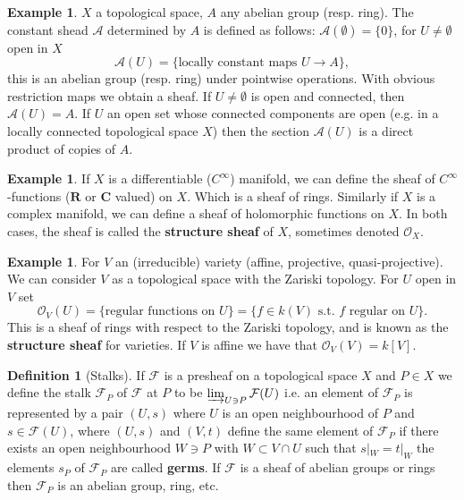 \documentclass[10pt,]{book}
\newcommand{\terminology}[1]{\textbf{#1}}
\theoremstyle{plain}
\theoremstyle{definition}
\newtheorem{definition}[theorem]{Definition}
\newtheorem{example}[theorem]{Example}
\newcommand{\CC}{\mathbf{C}}
\newcommand{\RR}{\mathbf{R}}
\newcommand{\A}{\mathcal{A}}
\newcommand{\F}{\mathcal{F}}
\newcommand{\cO}{\mathcal{O}}
\begin{document}
\begin{example}\label{example-1}
\(X\) a topological space, \(A\) any abelian group (resp. ring).
            The constant shead \(\A\) determined by \(A\) is defined as follows: \(\A(\emptyset) = \{0\}\), for \(U \ne \emptyset\) open in \(X\)\[\A(U) = \{\text{locally constant maps }U\to A\},\] this is an abelian group (resp. ring) under pointwise operations.
            With obvious restriction maps we obtain a sheaf.
            If \(U \ne \emptyset\) is open and connected, then \(\A(U) = A\).
            If \(U\) an open set whose connected components are open (e.g. in a locally connected topological space \(X\)) then the section \(\A(U)\) is a direct product of copies of \(A\).
          \end{example}
\begin{example}\label{example-2}
If \(X\) is a differentiable (\(C^\infty\)) manifold, we can define the sheaf of \(C^\infty\)-functions (\(\RR\) or \(\CC\) valued) on \(X\).
            Which is a sheaf of rings.
            Similarly if \(X\) is a complex manifold, we can define a sheaf of holomorphic functions on \(X\).
            In both cases, the sheaf is called the \terminology{structure sheaf} of \(X\), sometimes denoted \(\cO_X\).
          \end{example}
\begin{example}\label{example-3}
For \(V\) an (irreducible) variety (affine, projective, quasi-projective).
            We can consider \(V\) as a topological space with the Zariski topology.
            For \(U\) open in \(V\) set \[\cO_V(U)=\{\text{regular functions on } U\} = \{f\in k(V) \text{ s.t. }f \text{ regular on } U\}.\]
            This is a sheaf of rings with respect to the Zariski topology, and is known as the \terminology{structure sheaf} for varieties.
            If \(V\) is affine we have that \(\cO_V(V) = k[V]\).
          \end{example}
\begin{definition}[Stalks]\label{definition-3}
If \(\F\) is a presheaf on a topological space \(X\) and \(P\in X\) we define the stalk \(\F_P\) of \(\F\) at \(P\) to be \(\varinjlim_{U\ni P} \F(U)\) i.e. an element of \(\F_P\) is represented by a pair \((U,s)\) where \(U\) is an open neighbourhood of \(P\) and \(s\in \F(U)\), where \((U,s)\) and \((V,t)\) define the same element of \(\F_P\) if there exists an open neighbourhood \(W\ni P\) with \(W\subset V\cap U\) such that \(s|_W = t|_W\) the elements \(s_P\) of \(\F_P\) are called \terminology{germs}.
            If \(\F\) is a sheaf of abelian groups or rings then \(\F_P\) is an abelian group, ring, etc.
          \end{definition}
\end{document}
